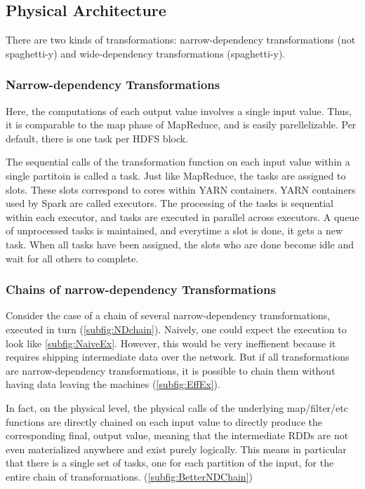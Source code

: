 \subsection{Physical Architecture}

There are two kinds of transformations: narrow-dependency transformations (not spaghetti-y) and wide-dependency transformations (spaghetti-y).

\subsubsection{Narrow-dependency Transformations}
Here, the computations of each output value involves a single input value. Thus, it is comparable to the map phase of MapReduce, and is easily parellelizable. Per default, there is one task per HDFS block.

The sequential calls of the transformation function on each input value within a single partitoin is called a task. Just like MapReduce, the tasks are assigned to slots. These slots correspond to cores within YARN containers. YARN containers used by Spark are called executors. The processing of the tasks is sequential within each executor, and tasks are executed in parallel across executors. A queue of unprocessed tasks is maintained, and everytime a slot is done, it gets a new task. When all tasks have been assigned, the slots who are done become idle and wait for all others to complete.

\subsubsection{Chains of narrow-dependency Transformations}

Consider the case of a chain of several narrow-dependency transformations, executed in turn (\cref{subfig:NDchain}). Naively, one could expect the execution to look like \cref{subfig:NaiveEx}. However, this would be very ineffienent because it requires shipping intermediate data over the network. But if all transformations are narrow-dependency transformations, it is possible to chain them without having data leaving the machines (\cref{subfig:EffEx}).

In fact, on the physical level, the physical calls of the underlying map/filter/etc functions are directly chained on each input value to directly produce the corresponding final, output value, meaning that the intermediate RDDs are not even materialized anywhere and exist purely logically. This means in particular that there is a single set of tasks, one for each partition of the input, for the entire chain of transformations. (\cref{subfig:BetterNDChain})

